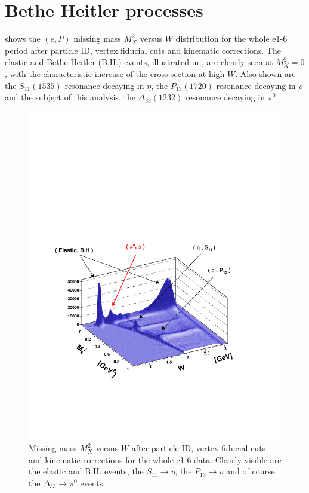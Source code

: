\cia\vspace{-2cm}
\section{Bethe Heitler processes}
\label{sec:bethe} 
 shows the $(e,P)$ missing mass $M_X^2$ versus $W$ distribution
for the whole e1-6 period after particle ID, vertex fiducial cuts and kinematic corrections.
The elastic and Bethe Heitler (B.H.) events, illustrated in ,
are clearly seen at $M_X^2=0$, with the characteristic increase of
the cross section at high $W$. Also shown are the $S_{11}(1535)$ resonance decaying in $\eta$, 
the $P_{13}(1720)$ resonance decaying in $\rho$ and the subject of this analysis, the
$\Delta_{33}(1232)$ resonance decaying in $\pi^0$.

\begin{figure}[h]
 \begin{center}
 \includegraphics[width = 14cm, bb=0 120 540 540]{data_reduction/img/wmm_after_fiducial}   
  \caption[Missing mass $M_X^2$ versus $W$ after particle ID, vertex fiducial cuts and kinematic corrections for the whole e1-6 data]
          { Missing mass $M_X^2$ versus $W$ after particle ID, vertex fiducial cuts and kinematic 
                     corrections for the whole e1-6 data. Clearly visible are the elastic and B.H. events, the  
		     $S_{11}\rightarrow\eta$, the $P_{13}\rightarrow\rho$ and of course the $\Delta_{33}\rightarrow\pi^0$ events.}
 \label{fig:wmm_after_fiducial}
 \end{center} 
\end{figure}

